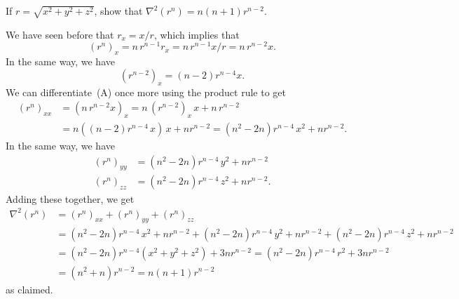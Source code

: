 \documentclass[a4paper]{amsart}
\renewenvironment{solution}{\SolutionInline}{\endSolutionInline}
\begin{document}
\begin{exercise}
 If $r=\sqrt{x^2+y^2+z^2}$, show that $\nabla^2(r^n)=n(n+1)r^{n-2}$.
\end{exercise}
\begin{solution}
 We have seen before that $r_x=x/r$, which implies that
 \[ (r^n)_x = n\,r^{n-1} r_x = n\, r^{n-1} x/r = n\,r^{n-2} x.
      \tag{A}
 \]
 In the same way, we have
 \[ (r^{n-2})_x = (n-2) r^{n-4} x. \]
 We can differentiate~(A) once more using the product rule to get
 \begin{align*}
  (r^n)_{xx}
   &= (n\,r^{n-2}x)_x
    = n\,(r^{n-2})_x\,x + n\,r^{n-2} \\
   &= n((n-2) r^{n-4}\,x)\,x + n r^{n-2} 
    = (n^2-2n) r^{n-4}\,x^2 + n r^{n-2}.
 \end{align*}
 In the same way, we have 
 \begin{align*}
  (r^n)_{yy} &= (n^2-2n) r^{n-4}\,y^2 + n r^{n-2} \\
  (r^n)_{zz} &= (n^2-2n) r^{n-4}\,z^2 + n r^{n-2}.
 \end{align*}
 Adding these together, we get
 \begin{align*}
  \nabla^2(r^n) 
   &= (r^n)_{xx} + (r^n)_{yy} + (r^n)_{zz} \\
   &= (n^2-2n) r^{n-4}\,x^2 + n r^{n-2} + 
      (n^2-2n) r^{n-4}\,y^2 + n r^{n-2} + 
      (n^2-2n) r^{n-4}\,z^2 + n r^{n-2} \\
   &= (n^2-2n) r^{n-4}(x^2+y^2+z^2) + 3nr^{n-2} 
    = (n^2-2n) r^{n-4}\,r^2 + 3nr^{n-2} \\
   &= (n^2+n) r^{n-2} = n(n+1)r^{n-2}
 \end{align*}
 as claimed.
\end{solution}
\end{document}
